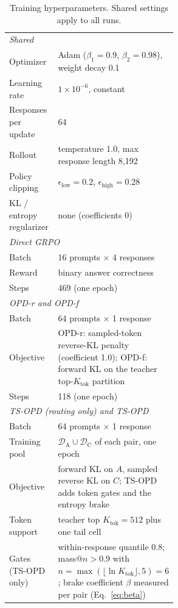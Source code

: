 \documentclass[10pt]{article}
\newcommand{\tsopd}{TS-OPD}
\begin{document}
\begin{table}[h]
\centering
\small
\caption{Training hyperparameters. Shared settings apply to all runs.}
\label{tab:app-config}
\begin{tabular}{lp{0.55\linewidth}}
\toprule
\multicolumn{2}{l}{\textit{Shared}} \\
Optimizer & Adam ($\beta_1=0.9$, $\beta_2=0.98$), weight decay 0.1 \\
Learning rate & $1\times10^{-6}$, constant \\
Responses per update & 64 \\
Rollout & temperature 1.0, max response length 8{,}192 \\
Policy clipping & $\epsilon_{\text{low}}=0.2$, $\epsilon_{\text{high}}=0.28$ \\
KL / entropy regularizer & none (coefficients 0) \\
\midrule
\multicolumn{2}{l}{\textit{Direct GRPO}} \\
Batch & 16 prompts $\times$ 4 responses \\
Reward & binary answer correctness \\
Steps & 469 (one epoch) \\
\midrule
\multicolumn{2}{l}{\textit{OPD-r and OPD-f}} \\
Batch & 64 prompts $\times$ 1 response \\
Objective & OPD-r: sampled-token reverse-KL penalty (coefficient 1.0);
OPD-f: forward KL on the teacher top-$K_{\mathrm{tok}}$ partition \\
Steps & 118 (one epoch) \\
\midrule
\multicolumn{2}{l}{\textit{\tsopd{} (routing only) and \tsopd{}}} \\
Batch & 64 prompts $\times$ 1 response \\
Training pool & $\mathcal D_{\mathrm A}\cup\mathcal D_{\mathrm C}$ of each pair, one epoch \\
Objective & forward KL on $A$, sampled reverse KL on $C$; \tsopd{} adds token
gates and the entropy brake \\
Token support & teacher top $K_{\mathrm{tok}}=512$ plus one tail cell \\
Gates (\tsopd{} only) & within-response quantile $0.8$; mass@$n>0.9$ with
$n=\max(\lfloor\ln K_{\mathrm{tok}}\rfloor,5)=6$; brake coefficient $\beta$
measured per pair (Eq.~\ref{eq:beta}) \\
\bottomrule
\end{tabular}
\end{table}
\end{document}
